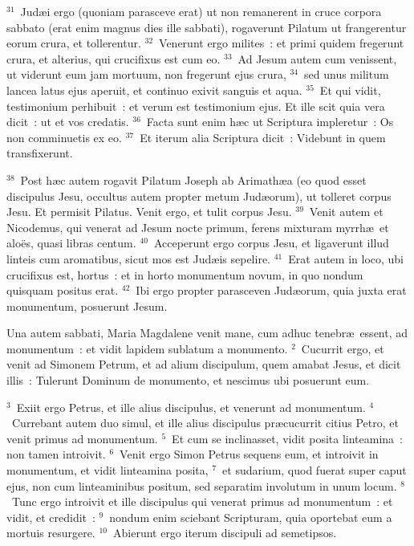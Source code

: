 ${}^{31}$~Jud\ae i ergo (quoniam parasceve erat) ut non remanerent in cruce corpora sabbato (erat enim magnus dies ille sabbati), rogaverunt Pilatum ut frangerentur eorum crura, et tollerentur.
${}^{32}$~Venerunt ergo milites~: et primi quidem fregerunt crura, et alterius, qui crucifixus est cum eo.
${}^{33}$~Ad Jesum autem cum venissent, ut viderunt eum jam mortuum, non fregerunt ejus crura,
${}^{34}$~sed unus militum lancea latus ejus aperuit, et continuo exivit sanguis et aqua.
${}^{35}$~Et qui vidit, testimonium perhibuit~: et verum est testimonium ejus. Et ille scit quia vera dicit~: ut et vos credatis.
${}^{36}$~Facta sunt enim h\ae c ut Scriptura impleretur~: Os non comminuetis ex eo.
${}^{37}$~Et iterum alia Scriptura dicit~: Videbunt in quem transfixerunt.


${}^{38}$~Post h\ae c autem rogavit Pilatum Joseph ab Arimath\ae a (eo quod esset discipulus Jesu, occultus autem propter metum Jud\ae orum), ut tolleret corpus Jesu. Et permisit Pilatus. Venit ergo, et tulit corpus Jesu.
${}^{39}$~Venit autem et Nicodemus, qui venerat ad Jesum nocte primum, ferens mixturam myrrh\ae\ et alo\"es, quasi libras centum.
${}^{40}$~Acceperunt ergo corpus Jesu, et ligaverunt illud linteis cum aromatibus, sicut mos est Jud\ae is sepelire.
${}^{41}$~Erat autem in loco, ubi crucifixus est, hortus~: et in horto monumentum novum, in quo nondum quisquam positus erat.
${}^{42}$~Ibi ergo propter parasceven Jud\ae orum, quia juxta erat monumentum, posuerunt Jesum.

\lettrine[lines=3,image=true,loversize=0.05,lraise=-0.03]{U}{}na autem sabbati, Maria Magdalene venit mane, cum adhuc tenebr\ae\ essent, ad monumentum~: et vidit lapidem sublatum a monumento.
${}^{2}$~Cucurrit ergo, et venit ad Simonem Petrum, et ad alium discipulum, quem amabat Jesus, et dicit illis~: Tulerunt Dominum de monumento, et nescimus ubi posuerunt eum.


${}^{3}$~Exiit ergo Petrus, et ille alius discipulus, et venerunt ad monumentum.
${}^{4}$~Currebant autem duo simul, et ille alius discipulus pr\ae cucurrit citius Petro, et venit primus ad monumentum.
${}^{5}$~Et cum se inclinasset, vidit posita linteamina~: non tamen introivit.
${}^{6}$~Venit ergo Simon Petrus sequens eum, et introivit in monumentum, et vidit linteamina posita,
${}^{7}$~et sudarium, quod fuerat super caput ejus, non cum linteaminibus positum, sed separatim involutum in unum locum.
${}^{8}$~Tunc ergo introivit et ille discipulus qui venerat primus ad monumentum~: et vidit, et credidit~:
${}^{9}$~nondum enim sciebant Scripturam, quia oportebat eum a mortuis resurgere.
${}^{10}$~Abierunt ergo iterum discipuli ad semetipsos.


